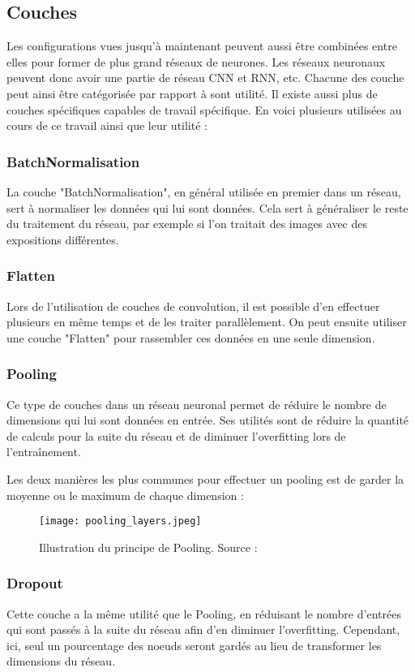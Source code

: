\subsection{Couches}
Les configurations vues jusqu'à maintenant peuvent aussi être combinées entre elles pour former de plus grand réseaux de neurones.
Les réseaux neuronaux peuvent donc avoir une partie de réseau CNN et RNN, etc. Chacune des couche peut ainsi être catégorisée par
rapport à sont utilité.
Il existe aussi plus de couches spécifiques capables de travail spécifique. En voici plusieurs utilisées au cours de ce travail ainsi que leur utilité :

\subsubsection{BatchNormalisation}
La couche "BatchNormalisation", en général utilisée en premier dans un réseau, sert à normaliser les données qui lui sont données.
Cela sert à généraliser le reste du traitement du réseau, par exemple si l'on traitait des images avec des expositions différentes.

\subsubsection{Flatten}
Lors de l'utilisation de couches de convolution, il est possible d'en effectuer plusieurs en même temps et de les traiter parallèlement.
On peut ensuite utiliser une couche "Flatten" pour rassembler ces données en une seule dimension.

\subsubsection{Pooling}
Ce type de couches dans un réseau neuronal permet de réduire le nombre de dimensions qui lui sont données en entrée.
Ses utilités sont de réduire la quantité de calculs pour la suite du réseau et de diminuer l'overfitting lors de l'entraînement.

Les deux manières les plus communes pour effectuer un pooling est de garder la moyenne ou le maximum de chaque dimension :

\begin{figure}[tbph!]
	\centering
	\texttt{[image: pooling\_layers.jpeg]}
	\caption[Illustration du principe de Pooling]{Illustration du principe de Pooling. Source : \cite{PoolingImage}}
\end{figure}

\subsubsection{Dropout}
Cette couche a la même utilité que le Pooling, en réduisant le nombre d'entrées qui sont passés à la suite du réseau afin d'en diminuer l'overfitting.
Cependant, ici, seul un pourcentage des noeuds seront gardés au lieu de transformer les dimensions du réseau.

